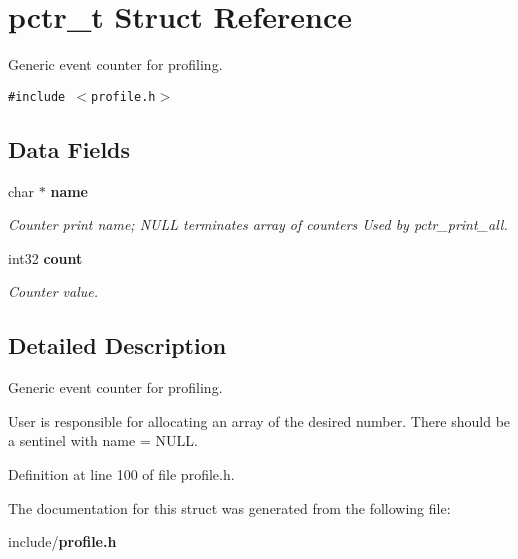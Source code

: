 \section{pctr\_\-t Struct Reference}
\label{structpctr__t}
Generic event counter for profiling.  


{\tt \#include $<$profile.h$>$}

\subsection*{Data Fields}
\begin{CompactItemize}
\item 
char $\ast$ {\bf name}\label{structpctr__t_9674298e968c73272d477593c7b41ed5}

\begin{CompactList}\small\item\em Counter print name; NULL terminates array of counters Used by pctr\_\-print\_\-all. \item\end{CompactList}\item 
int32 {\bf count}\label{structpctr__t_dc5e6467eceb66d4f56a20514d06eb55}

\begin{CompactList}\small\item\em Counter value. \item\end{CompactList}\end{CompactItemize}


\subsection{Detailed Description}
Generic event counter for profiling. 

User is responsible for allocating an array of the desired number. There should be a sentinel with name = NULL. 

Definition at line 100 of file profile.h.

The documentation for this struct was generated from the following file:\begin{CompactItemize}
\item 
include/{\bf profile.h}\end{CompactItemize}
